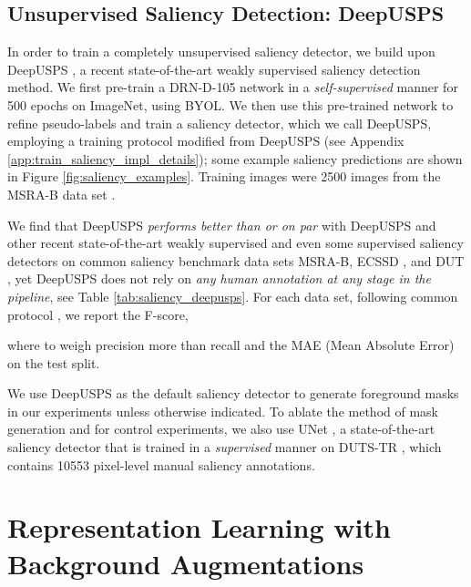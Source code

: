 \documentclass[twoside,11pt]{article}
\begin{document}
\subsection{Unsupervised Saliency Detection: DeepUSPS\texorpdfstring{}{2}}
In order to train a completely unsupervised saliency detector, we build upon DeepUSPS \citep{nguyen_deepusps_2019}, a recent state-of-the-art weakly supervised saliency detection method. We first pre-train a DRN-D-105 \citep{drn_yu_2017} network in a \textit{self-supervised} manner for 500 epochs on ImageNet, using BYOL. We then use this pre-trained network to refine pseudo-labels and train a saliency detector, which we call DeepUSPS, employing a training protocol modified from DeepUSPS (see Appendix \ref{app:train_saliency_impl_details}); some example saliency predictions are shown in Figure \ref{fig:saliency_examples}. Training images were 2500 images from the MSRA-B data set \citep{liu_learning_2011}.

We find that DeepUSPS \textit{performs better than or on par} with DeepUSPS and other recent state-of-the-art weakly supervised and even some supervised saliency detectors on common saliency benchmark data sets MSRA-B, ECSSD \citep{yan_hierarchical_2013}, and DUT \citep{yan_hierarchical_2013}, yet DeepUSPS does not rely on \textit{any human annotation at any stage in the pipeline}, see Table \ref{tab:saliency_deepusps}. For each data set, following common protocol \citep{nguyen_deepusps_2019, achanta_frequency-tuned_2009}, we report the F-score, 

where  to weigh precision more than recall and the MAE (Mean Absolute Error) on the test split. 

We use DeepUSPS as the default saliency detector to generate foreground masks in our experiments unless otherwise indicated. To ablate the method of mask generation and for control experiments, we also use UNet \citep{u2net}, a state-of-the-art saliency detector that is trained in a \textit{supervised} manner on DUTS-TR \citep{duts_tr_wang2017}, which contains 10553 pixel-level manual saliency annotations. 
 \section{Representation Learning with Background Augmentations} 
\label{sec:imnet_eval}
\end{document}
